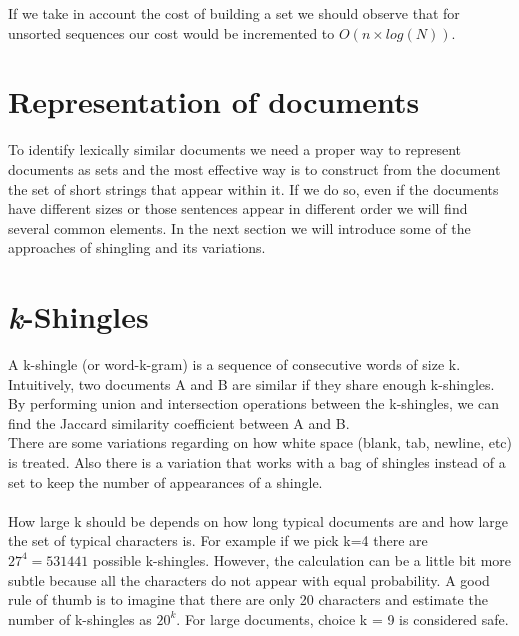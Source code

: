 \documentclass[12pt]{article}
\begin{document}
If we take in account the cost of building a set we should observe that for unsorted sequences our cost would be incremented to $O(n \times log(N))$.


\section{Representation of documents}

To identify lexically similar documents we need a proper way to represent documents as sets and the most effective way is to construct from the document the set of short strings that appear within it. If we do so, even if the documents have different sizes or those sentences appear in different order we will find several common elements. In the next section we will introduce some of the approaches of shingling and its variations.

\section{\textit{k}-Shingles} \label{kShingles}

A k-shingle (or word-k-gram) is a sequence of consecutive words of size k. Intuitively, two documents A and B are similar if they share enough k-shingles. By performing union and intersection operations between the k-shingles, we can find the Jaccard similarity coefficient between A and B. 
\\
There are some variations regarding on how white space (blank, tab, newline, etc) is treated. Also there is a variation that works with a bag of shingles instead of a set to keep the number of appearances of a shingle. \medskip \\
\\
How large k should be depends on how long typical documents are and how large the set of typical characters is. For example if we pick k=4 there are $27^4=531441 $ possible k-shingles. However, the calculation can be a little bit more subtle because all the characters do not appear with equal probability. A good rule of thumb is to imagine that there are only 20 characters and estimate the number of k-shingles as $20^k$. For large documents, choice k = 9 is considered safe. 
\end{document}
